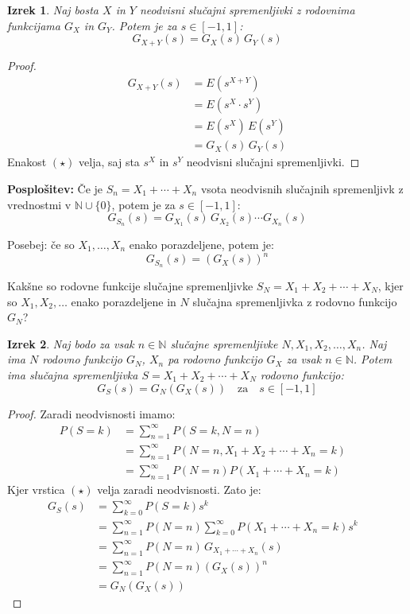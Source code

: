 \documentclass[12pt]{book}
\def\n{\noindent}
\def\s{\vspace{10pt}}
\theoremstyle{definition}
\theoremstyle{plain}
\newtheorem{izrek}{Izrek}
\theoremstyle{plain}
\theoremstyle{plain}
\theoremstyle{remark}
\begin{document}
\begin{izrek}
    Naj bosta $X$ in $Y$ neodvisni slučajni spremenljivki z rodovnima funkcijama $G_X$ in $G_Y$. Potem je za $s \in [-1,1]$: 
    $$
    G_{X+Y}(s)=G_X(s) \, G_Y(s)
    $$
\end{izrek}

\begin{proof}
    \begin{align*}
        G_{X+Y}(s)&=E\left(s^{X+Y}\right) \\
        &=E(s^X \cdot s^Y) \\
        &=E(s^X) \, E(s^Y) \tag{$\star$} \\
        &=G_X(s) \, G_Y(s)
    \end{align*}
    Enakost $(\star)$ velja, saj sta $s^X$ in $s^Y$ neodvisni slučajni spremenljivki.
\end{proof}

\n \textbf{Posplošitev:} Če je $S_n=X_1 + \cdots + X_n$ vsota neodvisnih slučajnih spremenljivk z vrednostmi v $\mathbb{N} \cup \{0\}$, potem je za $s \in [-1, 1]$: 
$$
G_{S_n}(s)=G_{X_1}(s)\, G_{X_2}(s) \cdots G_{X_n}(s)
$$

\n Posebej: če so $X_1, \ldots, X_n$ enako porazdeljene, potem je: 
$$
G_{S_n}(s)=\left(G_X(s)\right)^n
$$

\s

\n Kakšne so rodovne funkcije slučajne spremenljivke $S_N=X_1 + X_2 + \cdots + X_N$, kjer so $X_1, X_2, \ldots$ enako porazdeljene in $N$ slučajna spremenljivka z rodovno funkcijo $G_N$?

\begin{izrek}
    Naj bodo za vsak $n \in \mathbb{N}$ slučajne spremenljivke $N, X_1, X_2, \ldots, X_n$. Naj ima $N$ rodovno funkcijo $G_N$, $X_n$ pa rodovno funkcijo $G_X$ za vsak $n \in \mathbb{N}$. Potem ima slučajna spremenljivka $S=X_1+X_2+\cdots+X_N$ rodovno funkcijo: 
    $$
    G_S(s)=G_N\left(G_X(s)\right) \quad \text{za} \quad s \in [-1,1]
    $$
\end{izrek}

\begin{proof}
    Zaradi neodvisnosti imamo: 
    \begin{align*}
        P(S=k)&=\sum_{n=1}^{\infty} P(S=k, N=n) & \\
        &=\sum_{n=1}^{\infty} P\left(N=n, X_1+X_2+ \cdots +X_n=k\right) & \\
        &=\sum_{n=1}^{\infty} P(N=n) P\left(X_1+\cdots+X_n=k\right) & \tag{$\star$}
    \end{align*}
    Kjer vrstica $(\star)$ velja zaradi neodvisnosti. Zato je: 
    \begin{align*}
        G_S(s)&=\sum_{k=0}^{\infty} P(S=k) s^k & \\
        &=\sum_{n=1}^{\infty} P(N=n) \sum_{k=0}^{\infty} P\left(X_1+\cdots+X_n=k\right)  s^k & \\
        &=\sum_{n=1}^{\infty} P(N=n) \, G_{X_1+\cdots+X_n}\left(s\right) & \\
        &=\sum_{n=1}^{\infty} P(N=n) \left(G_X(s)\right)^n & \\
        &=G_N\left(G_X(s)\right)
    \end{align*}
\end{proof}
\end{document}
